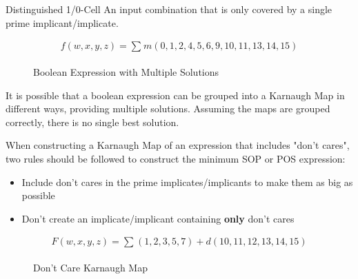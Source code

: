 \documentclass[12pt]{article}
\begin{document}
\begin{definition}{Distinguished 1/0-Cell}
  An input combination that is only covered by a single prime implicant/implicate.
\end{definition}
\vspace{-20pt}
\begin{align*}
  f(w,x,y,z) = \sum_{}^{} m(0,1,2,4,5,6,9,10,11,13,14,15)
\end{align*}
\begin{figure}[H]
  \vspace{-20pt}
  \begin{subfigure}[H]{0.325\textwidth}
    
  \end{subfigure}
  \begin{subfigure}[H]{0.325\textwidth}
    
  \end{subfigure}
  \begin{subfigure}[H]{0.325\textwidth}
    
  \end{subfigure}
  \caption{Boolean Expression with Multiple Solutions}
  \label{fig:009}
\end{figure}
It is possible that a boolean expression can be grouped into a Karnaugh Map in different ways, providing multiple
solutions. Assuming the maps are grouped correctly, there is no single best solution.

When constructing a Karnaugh Map of an expression that includes "don't cares", two rules should
be followed to construct the minimum SOP or POS expression:
\begin{itemize}
  \itemsep0em
  \item Include don't cares in the prime implicates/implicants to make them as big as possible
  \item Don't create an implicate/implicant containing \textbf{only} don't cares
\end{itemize}
\begin{align*}
  F(w,x,y,z) = \sum_{}^{} (1,2,3,5,7) + d(10,11,12,13,14,15)
\end{align*}
\begin{figure}[H]
  \vspace{-20pt}
  \centering
  \begin{subfigure}[H]{0.45\textwidth}
    \centering
    
  \end{subfigure}
  \begin{subfigure}[H]{0.45\textwidth}
    \centering
    
  \end{subfigure}
  \caption{Don't Care Karnaugh Map}
  \label{fig:010}
\end{figure}
\end{document}
